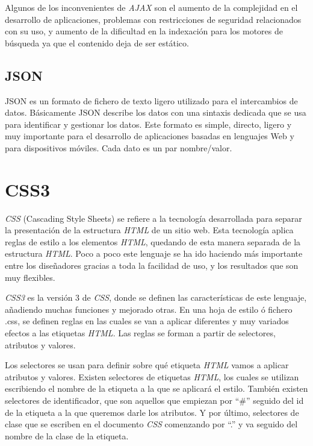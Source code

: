 \documentclass[a4paper, 12pt]{book}
\begin{document}
Algunos de los inconvenientes de \textit{AJAX} son el aumento de la complejidad en el desarrollo de aplicaciones, problemas con restricciones de seguridad 
relacionados con su uso, y aumento de la dificultad en la indexaci\'on para los motores de b\'usqueda ya que el contenido deja de ser est\'atico.


\subsection{JSON}
\label{subsec:json}
JSON es un formato de fichero de texto ligero utilizado para el intercambios de datos. B\'asicamente JSON describe los datos con una sintaxis dedicada 
que se usa para identificar y gestionar los datos. Este formato es simple, directo, ligero y muy importante para el desarrollo de aplicaciones basadas 
en lenguajes Web y para dispositivos m\'oviles. Cada dato es un par nombre/valor.


\section{CSS3}
\label{sec:css3}
\textit{CSS} (Cascading Style Sheets) se refiere a la tecnolog\'ia desarrollada para separar la presentaci\'on de la estructura \textit{HTML} de un sitio web. 
Esta tecnolog\'ia aplica reglas de estilo a los elementos \textit{HTML}, quedando de esta manera separada de la estructura \textit{HTML}. Poco a poco este lenguaje se 
ha ido haciendo m\'as importante entre los dise\~nadores gracias a toda la facilidad de uso, y los resultados que son muy flexibles.

\textit{CSS3} es la versi\'on 3 de \textit{CSS}, donde se definen las caracter\'isticas de este lenguaje, a\~nadiendo muchas funciones y mejorado otras.
En una hoja de estilo \'o fichero .css, se definen reglas en las cuales se van a aplicar diferentes y muy variados efectos a las etiquetas \textit{HTML}.
Las reglas se forman a partir de selectores, atributos y valores. 

Los selectores se usan para definir sobre qu\'e etiqueta \textit{HTML} vamos a aplicar atributos y valores. Existen selectores de etiquetas \textit{HTML}, los cuales 
se utilizan escribiendo el nombre de la etiqueta a la que se aplicar\'a el estilo. Tambi\'en existen selectores de identificador, que son aquellos que 
empiezan por ``\#'' seguido del id de la etiqueta a la que queremos darle los atributos. Y por \'ultimo, selectores de clase que se escriben en el 
documento \textit{CSS} comenzando por ``.'' y va seguido del nombre de la clase de la etiqueta.
\end{document}
